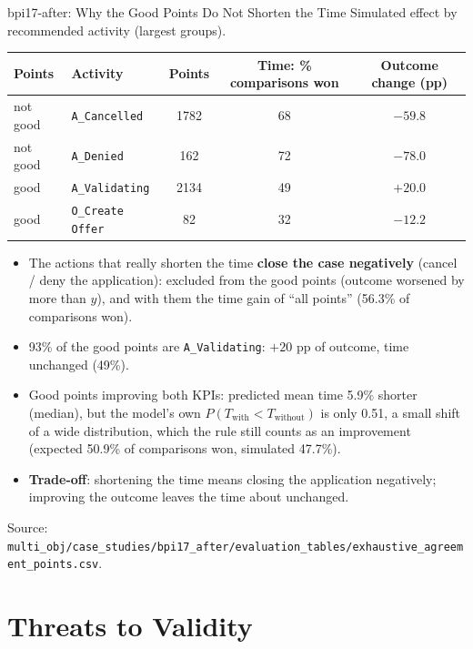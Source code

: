 \documentclass[aspectratio=169]{beamer} %
\begin{document}
\begin{frame}{bpi17-after: Why the Good Points Do Not Shorten the Time}
  \footnotesize
  Simulated effect by recommended activity (largest groups).
  \begin{center}\scriptsize
  \begin{tabular}{llccc}
    \toprule
    Points & Activity & Points & Time: \% comparisons won & Outcome change (pp) \\
    \midrule
    not good & \texttt{A\_Cancelled}    & 1782 & 68 & $-59.8$ \\
    not good & \texttt{A\_Denied}       &  162 & 72 & $-78.0$ \\
    good     & \texttt{A\_Validating}   & 2134 & 49 & $+20.0$ \\
    good     & \texttt{O\_Create Offer} &   82 & 32 & $-12.2$ \\
    \bottomrule
  \end{tabular}
  \end{center}
  \scriptsize
  \begin{itemize}
    \item The actions that really shorten the time \textbf{close the case negatively} (cancel / deny the
      application): excluded from the good points (outcome worsened by more than $y$), and with them the time
      gain of ``all points'' (56.3\% of comparisons won).
    \item 93\% of the good points are \texttt{A\_Validating}: $+20$ pp of outcome, time unchanged (49\%).
    \item Good points improving both KPIs: predicted mean time 5.9\% shorter (median), but the model's own
      $P(T_{\text{with}} < T_{\text{without}})$ is only 0.51, a small shift of a wide distribution, which the rule
      still counts as an improvement (expected 50.9\% of comparisons won, simulated 47.7\%).
    \item \textbf{Trade-off}: shortening the time means closing the application negatively; improving the outcome
      leaves the time about unchanged.
  \end{itemize}
  {\scriptsize Source: \texttt{multi\_obj/case\_studies/bpi17\_after/evaluation\_tables/exhaustive\_agreement\_points.csv}.}
\end{frame}

\section{Threats to Validity}
\end{document}

